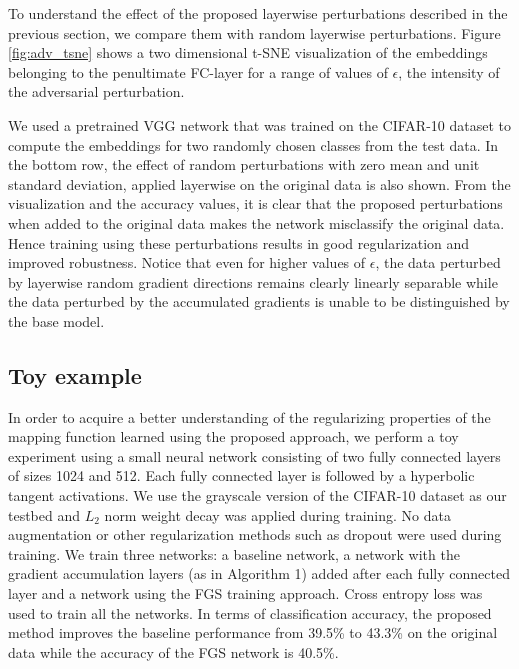 \documentclass[letterpaper]{article} %
\begin{document}
To understand the effect of the proposed layerwise perturbations described in the previous section, we compare them with random layerwise perturbations. Figure \ref{fig:adv_tsne} shows a two dimensional t-SNE \cite{maaten2008visualizing} visualization of the embeddings belonging to the penultimate FC-layer for a range of values of $\epsilon$, the intensity of the adversarial perturbation.

We used a pretrained VGG network that was trained on the CIFAR-10 dataset to compute the embeddings for two randomly chosen classes from the test data. In the bottom row, the effect of random perturbations with zero mean and unit standard deviation, applied layerwise on the original data is also shown. From the visualization and the accuracy values, it is clear that the proposed perturbations when added to the original data makes the network misclassify the original data. Hence training using these perturbations results in good regularization and improved robustness. Notice that even for higher values of $\epsilon$, the data perturbed by layerwise random gradient directions remains clearly linearly separable while the data perturbed by the accumulated gradients is unable to be distinguished by the base model.

\subsection{Toy example}\label{subsec:toy-eg}
In order to acquire a better understanding of the regularizing properties of the mapping function learned using the proposed approach, we perform a toy experiment using a small neural network consisting of two fully connected layers of sizes 1024 and 512. Each fully connected layer is followed by a hyperbolic tangent activations. We use the grayscale version of the CIFAR-10 dataset as our testbed and $L_2$ norm weight decay was applied during training. No data augmentation or other regularization methods such as dropout were used during training. We train three networks: a baseline network, a network with the gradient accumulation layers (as in Algorithm 1) added after each fully connected layer and a network using the FGS training approach. Cross entropy loss was used to train all the networks. In terms of classification accuracy, the proposed method improves the baseline performance from 39.5\% to 43.3\% on the original data while the accuracy of the FGS network is 40.5\%.
\end{document}
